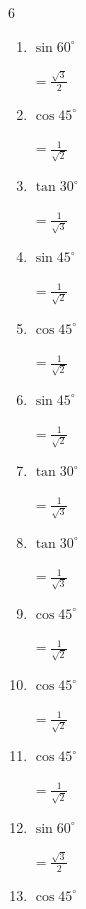 \begin{multicols}{6}
\begin{enumerate}
  \item $\displaystyle \sin{60^\circ}$

        $\displaystyle =\frac{\sqrt{3}}{2}$

  \item $\displaystyle \cos{45^\circ}$

        $\displaystyle =\frac{1}{\sqrt{2}}$

  \item $\displaystyle \tan{30^\circ}$

        $\displaystyle =\frac{1}{\sqrt{3}}$

  \item $\displaystyle \sin{45^\circ}$

        $\displaystyle =\frac{1}{\sqrt{2}}$

  \item $\displaystyle \cos{45^\circ}$

        $\displaystyle =\frac{1}{\sqrt{2}}$

  \item $\displaystyle \sin{45^\circ}$

        $\displaystyle =\frac{1}{\sqrt{2}}$

  \item $\displaystyle \tan{30^\circ}$

        $\displaystyle =\frac{1}{\sqrt{3}}$

\columnbreak %

  \item $\displaystyle \tan{30^\circ}$

        $\displaystyle =\frac{1}{\sqrt{3}}$

  \item $\displaystyle \cos{45^\circ}$

        $\displaystyle =\frac{1}{\sqrt{2}}$

  \item $\displaystyle \cos{45^\circ}$

        $\displaystyle =\frac{1}{\sqrt{2}}$

  \item $\displaystyle \cos{45^\circ}$

        $\displaystyle =\frac{1}{\sqrt{2}}$

  \item $\displaystyle \sin{60^\circ}$

        $\displaystyle =\frac{\sqrt{3}}{2}$

  \item $\displaystyle \cos{45^\circ}$


\end{enumerate}
\end{multicols}
